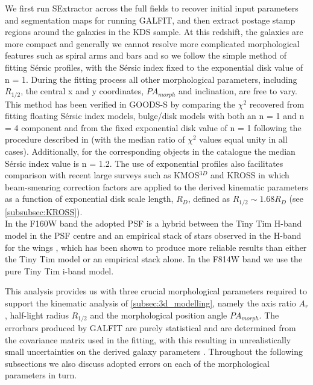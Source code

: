 \documentclass[fleqn,usenatbib]{mn2e}
\newcommand{\Sers}{S\'{e}rsic }
\begin{document}
We first run SExtractor \citep{Bertin1996} across the full fields to recover initial input parameters and segmentation maps for running GALFIT, and then extract postage stamp regions around the galaxies in the KDS sample.
At this redshift, the galaxies are more compact and generally we cannot resolve more complicated morphological features such as spiral arms and bars and so we follow the simple method of fitting \Sers profiles, with the \Sers index fixed to the exponential disk value of n = 1.
During the fitting process all other morphological parameters, including $R_{1/2}$, the central x and y coordinates, $PA_{morph}$ and inclination, are free to vary.
This method has been verified in GOODS-S by comparing the $\chi ^{2}$ recovered from fitting floating \Sers index models, bulge/disk models with both an n = 1 and n = 4 component and from the fixed exponential disk value of n = 1 following the procedure described in \cite{Bruce2012} (with the median ratio of $\chi ^{2}$ values equal unity in all cases). Additionally, for the corresponding objects in the \cite{VanderWel2012} catalogue the median \Sers index value is n = 1.2.
The use of exponential profiles also facilitates comparison with recent large surveys such as KMOS$^{3D}$ \citep{Wisnioski2015} and KROSS \citep{Harrison2017} in which beam-smearing correction factors are applied to the derived kinematic parameters as a function of exponential disk scale length, $R_{D}$, defined as $R_{1/2} \sim 1.68 R_{D}$ (see \cref{subsubsec:KROSS}). \\

In the F160W band the adopted PSF is a hybrid between the Tiny Tim H-band model \citep{Krist2011} in the PSF centre and an empirical stack of stars observed in the H-band for the wings \citep{VanderWel2012}, which has been shown to produce more reliable results than either the Tiny Tim model or an empirical stack alone.
In the F814W band we use the pure Tiny Tim i-band model.

This analysis provides us with three crucial morphological parameters required to support the kinematic analysis of \cref{subsec:3d_modelling}, namely the axis ratio $A_{r}$, half-light radius $R_{1/2}$ and the morphological position angle $PA_{morph}$. The errorbars produced by GALFIT are purely statistical and are determined from the covariance matrix used in the fitting, with this resulting in unrealistically small uncertainties on the derived galaxy parameters \citep{Hausler2007,Bruce2012}.
Throughout the following subsections we also discuss adopted errors on each of the morphological parameters in turn.
\end{document}
